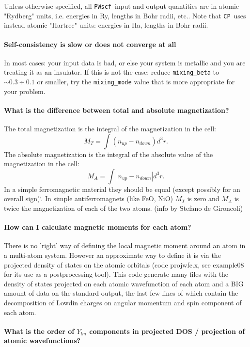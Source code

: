 \documentclass[12pt,a4paper]{article}
\def\PWscf{\texttt{PWscf}}
\def\CP{\texttt{CP}}
\begin{document}
Unless otherwise specified, all \PWscf\ input and output
quantities are in atomic "Rydberg" units, i.e. energies in Ry, lengths
in Bohr radii, etc.. Note that \CP\ uses instead atomic "Hartree" 
units: energies in Ha, lengths in Bohr radii. 

\paragraph{Self-consistency is slow or does not converge at all}

In most cases: your input data is bad, or else your system is metallic
and you are treating it as an insulator. If this is not the case:
reduce \texttt{mixing\_beta} to $\sim 0.3\div 0.1$ or smaller, 
try the \texttt{mixing\_mode} value that is more
  appropriate for your problem.


\paragraph{What is the difference between total and absolute magnetization?}

The total magnetization is the integral of the magnetization
in the cell: 
$$
M_T = \int (n_{up}-n_{down}) d^3r.
$$
The absolute magnetization is the integral of the absolute value of
the magnetization in the cell:
$$
M_A= \int |n_{up}-n_{down}| d^3r.
$$
In a simple ferromagnetic material they should be equal (except
possibly for an overall sign)`. In simple antiferromagnets (like FeO,
NiO) $M_T$ is zero and $M_A$ is twice the magnetization of each of the
two atoms. (info by Stefano de Gironcoli) 

\paragraph{How can I calculate magnetic moments for each atom?} 

There is no 'right' way of defining the local magnetic moment
around an atom in a multi-atom system. However an approximate way to define
it is via the projected density of states on the atomic orbitals (code
projwfc.x, see example08 for its use as a postprocessing tool). This
code generate many files with the density of states projected on each
atomic wavefunction of each atom and a BIG amount of data on the
standard output, the last few lines of which contain the decomposition
of Lowdin charges on angular momentum and spin component of each atom.

\paragraph{What is the order of $Y_{lm}$ components in projected
  DOS / projection of atomic wavefunctions?}
\end{document}
